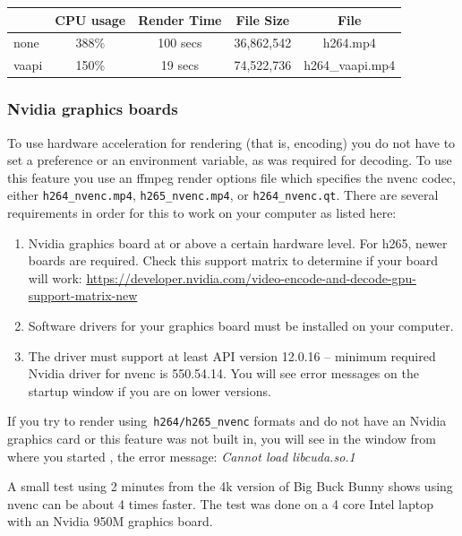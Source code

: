 \begin{center}
	\begin{tabular}{l|cccc}
		&CPU usage & Render Time & File Size & File \\
		\hline
		none & 388\% &100 secs &36,862,542 & h264.mp4 \\
		vaapi & 150\% & 19 secs & 74,522,736 & h264\_vaapi.mp4 \\
	\end{tabular}
\end{center}

\subsubsection*{Nvidia graphics boards}%
\label{ssub:nvidia_graphics_card}

To use hardware acceleration for rendering (that is, encoding) you do not have to set a preference or an environment variable, as was required for decoding.  To use this feature you use an ffmpeg render options file which specifies the nvenc codec, either \texttt{h264\_nvenc.mp4}, \texttt{h265\_nvenc.mp4}, or \texttt{h264\_nvenc.qt}.  There are several requirements in order for this to work on your computer as listed here:

\begin{enumerate}
	\item Nvidia graphics board at or above a certain hardware level.  For h265, newer boards are required.  Check this support matrix to determine if your board will work:
        \small \url{https://developer.nvidia.com/video-encode-and-decode-gpu-support-matrix-new}
	\item Software drivers for your graphics board must be installed on your computer.
	\item The driver must support at least API version 12.0.16 -- minimum required Nvidia driver for nvenc is
	550.54.14.  You will see error messages on the startup window if you are on lower versions.
\end{enumerate}

If you try to render using\texttt{ h264/h265\_nvenc} formats and do not have an Nvidia graphics card or this feature was not built in, you will see in the window from where you started \CGG{}, the error message: \qquad \textit{Cannot load libcuda.so.1}

A small test using 2 minutes from the 4k version of Big Buck Bunny shows using nvenc can be about 4 times faster.  The test was done on a 4 core Intel laptop with an Nvidia 950M graphics board.


